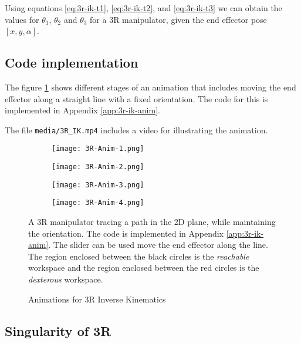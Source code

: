 Using equations \ref{eq:3r-ik-t1}, \ref{eq:3r-ik-t2}, and \ref{eq:3r-ik-t3} we can obtain the values for $\theta_1$, $\theta_2$ and $\theta_3$ for a 3R manipulator, given the end effector pose $[x, y, \alpha]$.

\subsection{Code implementation}

The figure \ref{fig:3r-ik-anim} shows different stages of an animation that includes moving the end effector along a straight line with a fixed orientation. The code for this is implemented in Appendix \ref{app:3r-ik-anim}.

The file \texttt{media/3R\_IK.mp4} includes a video for illustrating the animation.

\begin{figure}[ht]
    \centering
    \begin{subfigure}[b]{0.24\textwidth}
        \centering
        \texttt{[image: 3R-Anim-1.png]}
    \end{subfigure}
    \begin{subfigure}[b]{0.24\textwidth}
        \centering
        \texttt{[image: 3R-Anim-2.png]}
    \end{subfigure}
    \begin{subfigure}[b]{0.24\textwidth}
        \centering
        \texttt{[image: 3R-Anim-3.png]}
    \end{subfigure}
    \begin{subfigure}[b]{0.24\textwidth}
        \centering
        \texttt{[image: 3R-Anim-4.png]}
    \end{subfigure}
    \caption{Animations for 3R Inverse Kinematics}
    \label{fig:3r-ik-anim}
    \small
        A 3R manipulator tracing a path in the 2D plane, while maintaining the orientation. The code is implemented in Appendix \ref{app:3r-ik-anim}. The slider can be used move the end effector along the line. The region enclosed between the black circles is the \textit{reachable} workspace and the region enclosed between the red circles is the \textit{dexterous} workspace.
\end{figure}

\subsection{Singularity of 3R}

